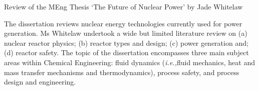 \documentclass[14pt,twoside]{report}
\newcommand{\ie}{{\it i.e.,}}
\begin{document}
\clearpage




\bigskip

\begin{center}
  {\Large Review of the MEng Thesis `The Future of Nuclear Power' by Jade Whitelaw}
\end{center}


The dissertation reviews nuclear energy technologies currently used for power generation. Ms Whitelaw undertook a wide but limited literature review on (a) nuclear reactor physics; (b) reactor types and design; (c) power generation and; (d) reactor safety. The topic of the dissertation encompasses three main subject areas within Chemical Engineering: fluid dynamics (\ie fluid mechanics, heat and mass transfer mechanisms and thermodynamics), process safety, and process design and engineering.
\end{document}
